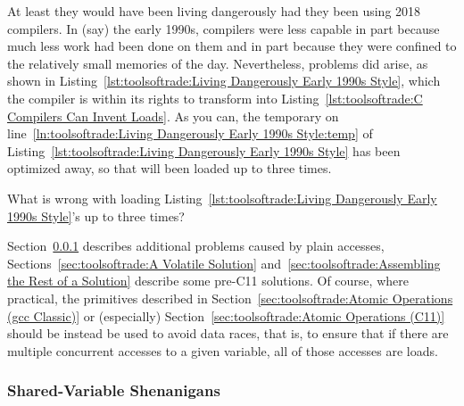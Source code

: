 At least they would have been living dangerously had they been using
2018 compilers.
In (say) the early 1990s, compilers were less capable in part because
much less work had been done on them and in part because they were
confined to the relatively small memories of the day.
Nevertheless, problems did arise, as shown in
Listing~\ref{lst:toolsoftrade:Living Dangerously Early 1990s Style},
which the compiler is within its rights to transform into
Listing~\ref{lst:toolsoftrade:C Compilers Can Invent Loads}.
As you can, the temporary on
line~\ref{ln:toolsoftrade:Living Dangerously Early 1990s Style:temp} of
Listing~\ref{lst:toolsoftrade:Living Dangerously Early 1990s Style}
has been optimized away, so that  will been loaded
up to three times.

\QuickQuiz{}
	What is wrong with loading
	Listing~\ref{lst:toolsoftrade:Living Dangerously Early 1990s Style}'s
	 up to three times?
 \QuickQuizEnd

Section~\ref{sec:toolsoftrade:Shared-Variable Shenanigans}
describes additional problems caused by plain accesses,
Sections~\ref{sec:toolsoftrade:A Volatile Solution}
and~\ref{sec:toolsoftrade:Assembling the Rest of a Solution}
describe some pre-C11 solutions.
Of course, where practical, the primitives described in
Section~\ref{sec:toolsoftrade:Atomic Operations (gcc Classic)}
or (especially)
Section~\ref{sec:toolsoftrade:Atomic Operations (C11)}
should be instead be used to avoid data races, that is, to ensure
that if there are multiple concurrent accesses to a given
variable, all of those accesses are loads.

\subsubsection{Shared-Variable Shenanigans}
\label{sec:toolsoftrade:Shared-Variable Shenanigans}

